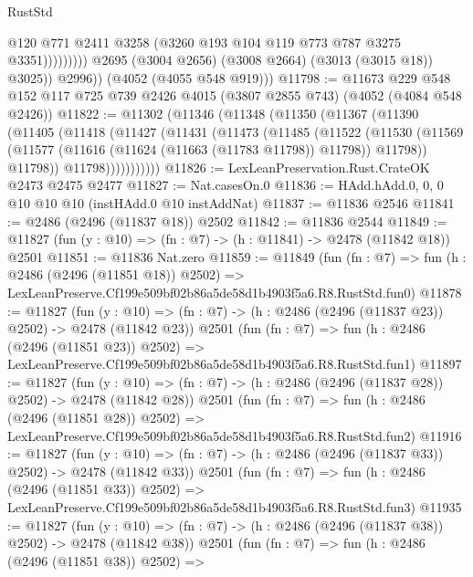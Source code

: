 \begin{lexlean}{RustStd}
\begin{coremodule}
                              @120
                              @771
                              @2411
                              @3258
                              (@3260 @193 @104 @119 @773 @787 @3275 @3351)))))))))
              @2695
              (@3004 @2656)
              (@3008 @2664)
              (@3013 (@3015 @18))
              @3025))
          @2996))
      (@4052 (@4055 @548 @919)))
@11798 := @11673
    @229
    @548
    @152
    @117
    @725
    @739
    @2426
    @4015
    (@3807 @2855 @743)
    (@4052 (@4084 @548 @2426))
@11822 := @11302
    (@11346
      (@11348
        (@11350
          (@11367
            (@11390
              (@11405
                (@11418
                  (@11427
                    (@11431
                      (@11473
                        (@11485
                          (@11522
                            (@11530
                              (@11569
                                (@11577 (@11616 (@11624 (@11663 (@11783 @11798)) @11798)) @11798))
                              @11798))
                          @11798)))))))))))
@11826 := LexLeanPreservation.Rust.CrateOK @2473 @2475 @2477
@11827 := Nat.casesOn.{0}
@11836 := HAdd.hAdd.{0, 0, 0} @10 @10 @10 (instHAdd.{0} @10 instAddNat)
@11837 := @11836 @2546
@11841 := @2486 (@2496 (@11837 @18)) @2502
@11842 := @11836 @2544
@11849 := @11827 (fun (y : @10) => (fn : @7) -> (h : @11841) -> @2478 (@11842 @18)) @2501
@11851 := @11836 Nat.zero
@11859 := @11849
    (fun (fn : @7) =>
    fun (h : @2486 (@2496 (@11851 @18)) @2502) =>
    LexLeanPreserve.Cf199e509bf02b86a5de58d1b4903f5a6.R8.RustStd.fun0)
@11878 := @11827
    (fun (y : @10) => (fn : @7) -> (h : @2486 (@2496 (@11837 @23)) @2502) -> @2478 (@11842 @23))
    @2501
    (fun (fn : @7) =>
    fun (h : @2486 (@2496 (@11851 @23)) @2502) =>
    LexLeanPreserve.Cf199e509bf02b86a5de58d1b4903f5a6.R8.RustStd.fun1)
@11897 := @11827
    (fun (y : @10) => (fn : @7) -> (h : @2486 (@2496 (@11837 @28)) @2502) -> @2478 (@11842 @28))
    @2501
    (fun (fn : @7) =>
    fun (h : @2486 (@2496 (@11851 @28)) @2502) =>
    LexLeanPreserve.Cf199e509bf02b86a5de58d1b4903f5a6.R8.RustStd.fun2)
@11916 := @11827
    (fun (y : @10) => (fn : @7) -> (h : @2486 (@2496 (@11837 @33)) @2502) -> @2478 (@11842 @33))
    @2501
    (fun (fn : @7) =>
    fun (h : @2486 (@2496 (@11851 @33)) @2502) =>
    LexLeanPreserve.Cf199e509bf02b86a5de58d1b4903f5a6.R8.RustStd.fun3)
@11935 := @11827
    (fun (y : @10) => (fn : @7) -> (h : @2486 (@2496 (@11837 @38)) @2502) -> @2478 (@11842 @38))
    @2501
    (fun (fn : @7) =>
    fun (h : @2486 (@2496 (@11851 @38)) @2502) =>

\end{coremodule}
\end{lexlean}
